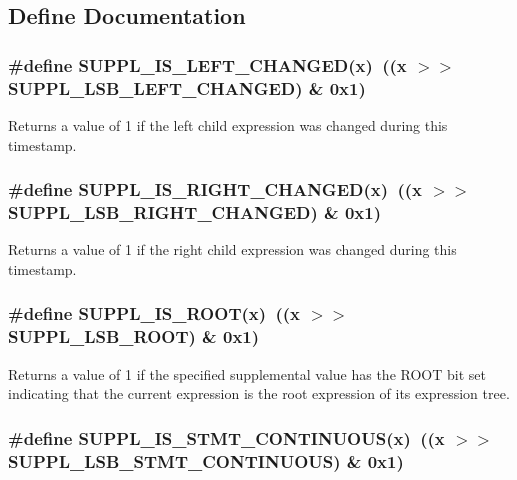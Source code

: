 \subsection{Define Documentation}
\subsubsection{\setlength{\rightskip}{0pt plus 5cm}\#define SUPPL\_\-IS\_\-LEFT\_\-CHANGED(x)\ ((x $>$$>$ SUPPL\_\-LSB\_\-LEFT\_\-CHANGED) \& 0x1)}\label{group__expr__suppl_a19}


Returns a value of 1 if the left child expression was changed during this timestamp. 
\subsubsection{\setlength{\rightskip}{0pt plus 5cm}\#define SUPPL\_\-IS\_\-RIGHT\_\-CHANGED(x)\ ((x $>$$>$ SUPPL\_\-LSB\_\-RIGHT\_\-CHANGED) \& 0x1)}\label{group__expr__suppl_a20}


Returns a value of 1 if the right child expression was changed during this timestamp. 
\subsubsection{\setlength{\rightskip}{0pt plus 5cm}\#define SUPPL\_\-IS\_\-ROOT(x)\ ((x $>$$>$ SUPPL\_\-LSB\_\-ROOT) \& 0x1)}\label{group__expr__suppl_a12}


Returns a value of 1 if the specified supplemental value has the ROOT bit set indicating that the current expression is the root expression of its expression tree. 
\subsubsection{\setlength{\rightskip}{0pt plus 5cm}\#define SUPPL\_\-IS\_\-STMT\_\-CONTINUOUS(x)\ ((x $>$$>$ SUPPL\_\-LSB\_\-STMT\_\-CONTINUOUS) \& 0x1)}\label{group__expr__suppl_a16}



